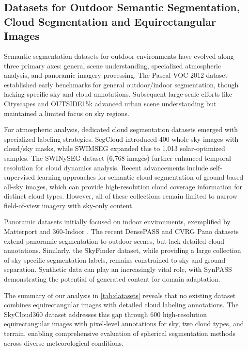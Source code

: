 \documentclass[conference]{IEEEtran}
\begin{document}
\subsection{Datasets for Outdoor Semantic Segmentation, Cloud Segmentation and Equirectangular Images}
\label{sec:rw_data}
Semantic segmentation datasets for outdoor environments have evolved along three primary axes: general scene understanding, specialized atmospheric analysis, and panoramic imagery processing. The Pascal VOC 2012 dataset \cite{everingham2010} established early benchmarks for general outdoor/indoor segmentation, though lacking specific sky and cloud annotations. Subsequent large-scale efforts like Cityscapes \cite{cityscapes} and OUTSIDE15k \cite{gerhardt2021outside} advanced urban scene understanding but maintained a limited focus on sky regions.

For atmospheric analysis, dedicated cloud segmentation datasets emerged with specialized labeling strategies. SegCloud \cite{martins2020} introduced 400 whole-sky images with cloud/sky masks, while SWIMSEG \cite{sheth2023} expanded this to 1,013 solar-optimized samples. The SWINySEG \cite{cloudsegnet} dataset (6,768 images) further enhanced temporal resolution for cloud dynamics analysis. 
Recent advancements include self-supervised learning approaches for semantic cloud segmentation of ground-based all-sky images, which can provide high-resolution cloud coverage information for distinct cloud types. 
However, all of these collections remain limited to narrow field-of-view imagery with sky-only content.

Panoramic datasets initially focused on indoor environments, exemplified by Matterport \cite{matterport2017} and 360-Indoor \cite{chou2020360}. 
The recent DensePASS \cite{densepass} and CVRG Pano \cite{seg_natural_outdoor_scenes} datasets extend panoramic segmentation to outdoor scenes, but lack detailed cloud annotations.
Similarly, the SkyFinder dataset, while providing a large collection of sky-specific segmentation labels, remains constrained to sky and ground separation.
Synthetic data can play an increasingly vital role, with SynPASS \cite{zhang2022behind} demonstrating the potential of generated content for domain adaptation.

The summary of our analysis in \autoref{tab:datasets} reveals that no existing dataset combines equirectangular images with detailed cloud labeling annotations.
The SkyCloud360 dataset addresses this gap through 600 high-resolution equirectangular images with pixel-level annotations for sky, two cloud types, and terrain, enabling comprehensive evaluation of spherical segmentation methods across diverse meteorological conditions.
\end{document}
